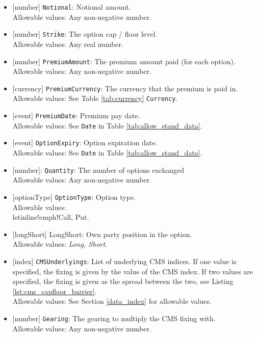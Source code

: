 \begin{itemize}
  \item{}[number] \lstinline!Notional!: Notional amount. \\
  Allowable values: Any non-negative number.
  \item{}[number] \lstinline!Strike!: The option cap / floor level. \\
  Allowable values: Any real number.
  \item{}[number] \lstinline!PremiumAmount!: The premium amount paid (for each option). \\
  Allowable values: Any non-negative number.
  \item{}[currency] \lstinline!PremiumCurrency!: The currency that the premium is paid in. \\
  Allowable values: See Table \ref{tab:currency} \lstinline!Currency!.
  \item{}[event] \lstinline!PremiumDate!: Premium pay date. \\
  Allowable values: See \lstinline!Date! in Table \ref{tab:allow_stand_data}.
  \item{}[event] \lstinline!OptionExpiry!: Option expiration date. \\
  Allowable values: See \lstinline!Date! in Table \ref{tab:allow_stand_data}.
  \item{}[number]: \lstinline!Quantity!: The number of options exchanged \\
  Allowable values: Any non-negative number.
  \item{}[optionType] \lstinline!OptionType!: Option type. \\
  Allowable values: \\lstinline!emph!{Call, Put}.
  \item{}[longShort] LongShort: Own party position in the option. \\
  Allowable values: \emph{Long, Short}.
  \item{}[index] \lstinline!CMSUnderlyings!: List of underlying CMS indices. If one value is specified, the fixing is given by
  the value of the CMS index. If two values are specified, the fixing is given as the spread between the two, see
  Listing \ref{lst:cms_capfloor_barrier}.\\
  Allowable values: See Section \ref{data_index} for allowable values.
  \item{}[number] \lstinline!Gearing!: The gearing to multiply the CMS fixing with.\\
  Allowable values: Any non-negative number.

\end{itemize}

